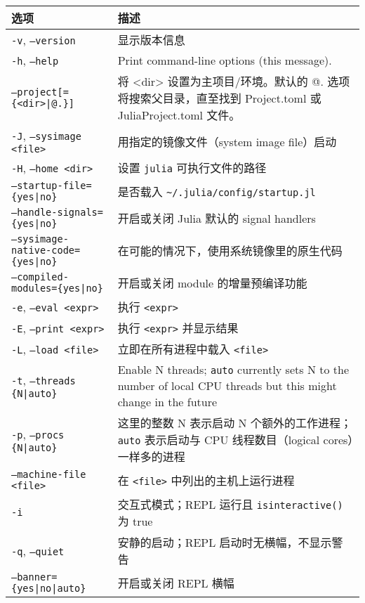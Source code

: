 \begin{table}[h]

\begin{tabulary}{\linewidth}{|L|L|}
\hline
选项 & 描述 \\
\hline
\texttt{-v}, \texttt{--version} & 显示版本信息 \\
\hline
\texttt{-h}, \texttt{--help} & Print command-line options (this message). \\
\hline
\texttt{--project[=\{<dir>|@.\}]} & 将 <dir> 设置为主项目/环境。默认的 @. 选项将搜索父目录，直至找到 Project.toml 或 JuliaProject.toml 文件。 \\
\hline
\texttt{-J}, \texttt{--sysimage <file>} & 用指定的镜像文件（system image file）启动 \\
\hline
\texttt{-H}, \texttt{--home <dir>} & 设置 \texttt{julia} 可执行文件的路径 \\
\hline
\texttt{--startup-file=\{yes|no\}} & 是否载入 \texttt{{\textasciitilde}/.julia/config/startup.jl} \\
\hline
\texttt{--handle-signals=\{yes|no\}} & 开启或关闭 Julia 默认的 signal handlers \\
\hline
\texttt{--sysimage-native-code=\{yes|no\}} & 在可能的情况下，使用系统镜像里的原生代码 \\
\hline
\texttt{--compiled-modules=\{yes|no\}} & 开启或关闭 module 的增量预编译功能 \\
\hline
\texttt{-e}, \texttt{--eval <expr>} & 执行 \texttt{<expr>} \\
\hline
\texttt{-E}, \texttt{--print <expr>} & 执行 \texttt{<expr>} 并显示结果 \\
\hline
\texttt{-L}, \texttt{--load <file>} & 立即在所有进程中载入 \texttt{<file>} \\
\hline
\texttt{-t}, \texttt{--threads \{N|auto\}} & Enable N threads; \texttt{auto} currently sets N to the number of local CPU threads but this might change in the future \\
\hline
\texttt{-p}, \texttt{--procs \{N|auto\}} & 这里的整数 N 表示启动 N 个额外的工作进程；\texttt{auto} 表示启动与 CPU 线程数目（logical cores）一样多的进程 \\
\hline
\texttt{--machine-file <file>} & 在 \texttt{<file>} 中列出的主机上运行进程 \\
\hline
\texttt{-i} & 交互式模式；REPL 运行且 \texttt{isinteractive()} 为 true \\
\hline
\texttt{-q}, \texttt{--quiet} & 安静的启动；REPL 启动时无横幅，不显示警告 \\
\hline
\texttt{--banner=\{yes|no|auto\}} & 开启或关闭 REPL 横幅 \\

\end{tabulary}
\end{table}
